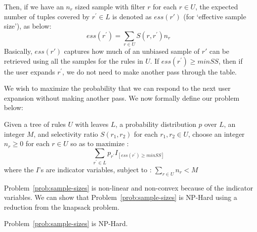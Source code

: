 Then, if we have an $n_r$ sized sample with filter $r$ for each $r \in U$, the expected number of tuples covered by $r^{\prime} \in L$ is denoted as $ess(r')$ (for `effective sample size'), as below: 
\begin{equation} \label{def:ess}
ess(r^{\prime}) = \sum_{r \in U} S(r, r^{\prime})n_r
\end{equation}
Basically, $ess(r')$ captures how much of an unbiased sample of $r'$ can be retrieved using all the samples for the rules in $U$.
If $ess(r^{\prime}) \geq minSS$, then if the user expands $r^{\prime}$, we do not need to make another 
pass through the table.

We wish to maximize the probability that we can respond to the next user expansion without making another pass. We now formally define our problem below:
\begin{problem}\label{prob:sample-sizes}
Given a tree of rules $U$ with leaves $L$, a probability distribution $p$ over $L$, an integer $M$, and selectivity ratio $S(r_1, r_2)$ for each $r_1, r_2 \in U$, 
choose an integer $n_r \geq 0$ for each $r \in U$ so as to $\textrm{maximize}$ :
$$\sum_{r^{\prime} \in L} p_{r^{\prime}}I_{[ess(r^{\prime}) \geq minSS]}$$
where the $I$'s are indicator variables, subject to :
$\sum_{r \in U} n_r < M$
\end{problem}
Problem~\ref{prob:sample-sizes} is non-linear and non-convex because of the indicator variables. 
We can show that Problem~\ref{prob:sample-sizes} is {\sc NP-Hard} using a reduction from the knapsack problem. 
\begin{lemma}\label{lemma:sampling-hardness}
Problem~\ref{prob:sample-sizes} is {\sc NP-Hard}.
\end{lemma}
